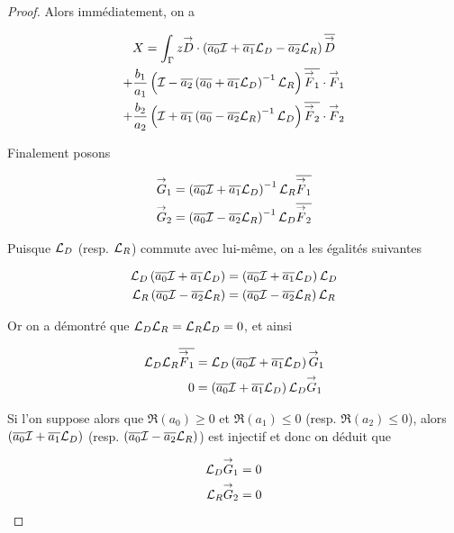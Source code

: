 \begin{proof}
    Alors immédiatement, on a

    \begin{multline}
      X = \int_\Gamma z {\overset{\rightarrow}{D}} \cdot \left({\overline{a_0}} {\mathcal{I}} + {\overline{a_1}} {\mathcal{L}_D} - {\overline{a_2}}{\mathcal{L}_R}\right){\overline{{\overset{\rightarrow}{D}}}}
      \\
      + \dfrac{b_1}{a_1} \left({\mathcal{I}} - {\overline{a_2}} \left( {\overline{a_0}} + {\overline{a_1}}{\mathcal{L}_D}\right)^{-1}{\mathcal{L}_R}\right){\overline{{\overset{\rightarrow}{F}}_1}}\cdot{\overset{\rightarrow}{F}}_1
      \\
      + \dfrac{b_2}{a_2} \left({\mathcal{I}} + {\overline{a_1}} \left( {\overline{a_0}} - {\overline{a_2}}{\mathcal{L}_R}\right)^{-1}{\mathcal{L}_D}\right){\overline{{\overset{\rightarrow}{F}}_2}}\cdot{\overset{\rightarrow}{F}}_2
    \end{multline}

    Finalement posons

    \newcommand{\vG}{\vect{G}}

    \begin{align}
      \vG_1 & = \left(\conj{a_0} \oI + \conj{a_1} \LD \right)^{-1}\LR \conj{\vF_1}
      \\
      \vG_2 & = \left(\conj{a_0} \oI - \conj{a_2} \LR \right)^{-1}\LD \conj{\vF_2}
    \end{align}

    Puisque \({\mathcal{L}_D}\) (resp. \({\mathcal{L}_R}\)) commute avec lui-même, on a les égalités suivantes

    \begin{align}
      {\mathcal{L}_D}\left({\overline{a_0}} {\mathcal{I}} + {\overline{a_1}} {\mathcal{L}_D} \right)&=\left({\overline{a_0}} {\mathcal{I}} + {\overline{a_1}} {\mathcal{L}_D} \right){\mathcal{L}_D}
      \\
      {\mathcal{L}_R}\left({\overline{a_0}} {\mathcal{I}} - {\overline{a_2}} {\mathcal{L}_R} \right)&=\left({\overline{a_0}} {\mathcal{I}} - {\overline{a_2}} {\mathcal{L}_R} \right){\mathcal{L}_R}
    \end{align}

    Or on a démontré que \({\mathcal{L}_D}{\mathcal{L}_R}={\mathcal{L}_R}{\mathcal{L}_D}=0\), et ainsi

    \begin{align}
      \LD\LR\conj{\vF_1} &= \LD\left(\conj{a_0} \oI + \conj{a_1} \LD \right)\vG_1
      \\
      0 & =\left(\conj{a_0} \oI + \conj{a_1} \LD \right)\LD\vG_1
    \end{align}

    Si l'on suppose alors que \(\Re(a_0) \ge 0 \) et \(\Re(a_1) \le 0\) (resp. \(\Re(a_2)\le0\)), alors \(\left({\overline{a_0}} {\mathcal{I}} + {\overline{a_1}} {\mathcal{L}_D} \right)\) (resp. \(\left({\overline{a_0}} {\mathcal{I}} - {\overline{a_2}} {\mathcal{L}_R} \right)\)) est injectif et donc on déduit que

    \begin{align}
      \LD\vG_1 = 0
      \\
      \LR\vG_2 = 0
    \end{align}


\end{proof}
